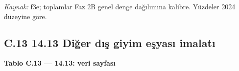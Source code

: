 \endgroup

\emph{Kaynak:} \etiketT{} f3e; toplamlar Faz 2B genel denge dağılımına kalibre. Yüzdeler 2024 düzeyine göre.

\hypertarget{nace_kartlar_13-15-c13-1413-diux11fer-dux131ux15f-giyim-eux15fyasux131-imalatux131}{%
\subsection{C.13 14.13 Diğer dış giyim eşyası imalatı}\label{nace_kartlar_13-15-c13-1413-diux11fer-dux131ux15f-giyim-eux15fyasux131-imalatux131}}


\textbf{Tablo C.13 --- 14.13: veri sayfası}

\nopagebreak[4]

\begingroup\gbtablo\small

